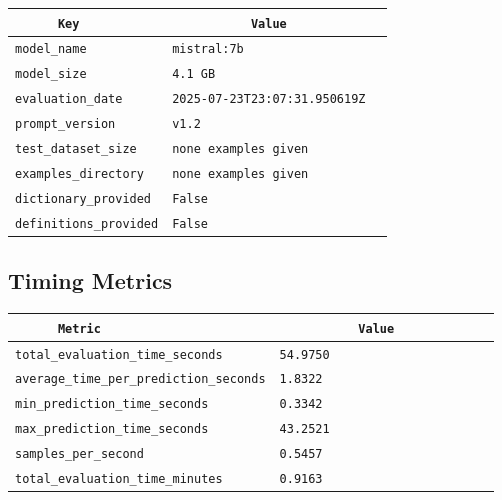 \documentclass{article}
\begin{document}
\begin{center}
\begin{tabular}{l | l} \hline
    \verb|      Key      | & \verb|           Value           | \\ \hline
    \hline
    \verb|model_name    | & \verb|mistral:7b                   | \\ \hline
    \verb|model_size    | & \verb|4.1 GB                       | \\ \hline
    \verb|evaluation_date| & \verb|2025-07-23T23:07:31.950619Z  | \\ \hline
    \verb|prompt_version| & \verb|v1.2                         | \\ \hline
    \verb|test_dataset_size| & \verb|none examples given          | \\ \hline
    \verb|examples_directory| & \verb|none examples given          | \\ \hline
    \verb|dictionary_provided| & \verb|False                        | \\ \hline
    \verb|definitions_provided| & \verb|False                        | \\ \hline
\end{tabular}
\end{center}

\subsection{Timing Metrics}

\begin{center}
\begin{tabular}{l | l} \hline
    \verb|      Metric     | & \verb|           Value           | \\ \hline
    \hline
    \verb|total_evaluation_time_seconds| & \verb|54.9750                      | \\ \hline
    \verb|average_time_per_prediction_seconds| & \verb|1.8322                       | \\ \hline
    \verb|min_prediction_time_seconds| & \verb|0.3342                       | \\ \hline
    \verb|max_prediction_time_seconds| & \verb|43.2521                      | \\ \hline
    \verb|samples_per_second| & \verb|0.5457                       | \\ \hline
    \verb|total_evaluation_time_minutes| & \verb|0.9163                       | \\ \hline
\end{tabular}
\end{center}
\end{document}
